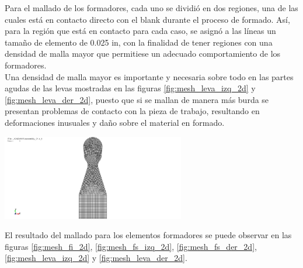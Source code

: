 Para el mallado de los formadores, cada uno se dividió en dos regiones, una de las cuales está en contacto directo 
con el blank durante el proceso de formado. Así, para la región que está en contacto para cada caso, se asignó 
a las líneas un tamaño de elemento de 0.025 in, con la finalidad de tener regiones con una densidad de malla mayor 
que permitiese un adecuado comportamiento de los formadores. \\

Una densidad de malla mayor es importante y necesaria sobre todo en las partes agudas de las levas mostradas en 
las figuras \ref{fig:mesh_leva_izq_2d} y \ref{fig:mesh_leva_der_2d}, puesto que si se mallan de manera más burda 
se presentan problemas de contacto con la pieza de trabajo, resultando en deformaciones inusuales y daño sobre 
el material en formado.

\begin{center}
\includegraphics[width=0.60\textwidth]{src/ch3/mesh_fi_2d.png}
\label{fig:mesh_fi_2d}
\end{center}

El resultado del mallado para los elementos formadores se puede observar en las figuras \ref{fig:mesh_fi_2d}, 
\ref{fig:mesh_fs_izq_2d}, \ref{fig:mesh_fs_der_2d}, \ref{fig:mesh_leva_izq_2d} y \ref{fig:mesh_leva_der_2d}.

